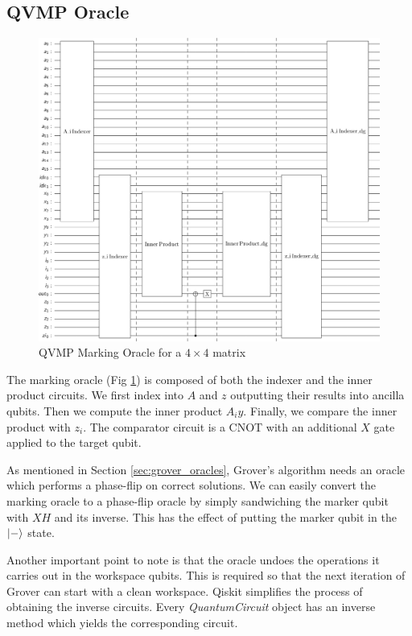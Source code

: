 \documentclass[11pt]{article}
\theoremstyle{definition}
\theoremstyle{remark}
\begin{document}
\subsection{QVMP Oracle}
\begin{figure}
  \centering
  \includegraphics[scale=0.3]{results/oracle_circuit_4x4.png} 
  \caption{QVMP Marking Oracle for a $4 \times 4$ matrix}
  \label{fig:marking_oracle_4x4}
\end{figure}
The marking oracle (Fig \ref{fig:marking_oracle_4x4}) is composed of both the
indexer and the inner product circuits. We first index into $A$ and $z$
outputting their results into ancilla qubits. Then we compute the inner product
$A_iy$. Finally, we compare the inner product with $z_i$. The comparator
circuit is a CNOT with an additional $X$ gate applied to the target qubit.

As mentioned in Section \ref{sec:grover_oracles}, Grover's algorithm needs an
oracle which performs a phase-flip on correct solutions. We can easily convert
the marking oracle to a phase-flip oracle by simply sandwiching the marker
qubit with $XH$ and its inverse. This has the effect of putting the marker
qubit in the $\ket{-}$ state.

Another important point to note is that the oracle undoes the operations it
carries out in the workspace qubits. This is required so that the next
iteration of Grover can start with a clean workspace. Qiskit simplifies the
process of obtaining the inverse circuits. Every \emph{QuantumCircuit} object has
an inverse method which yields the corresponding circuit.
\end{document}

